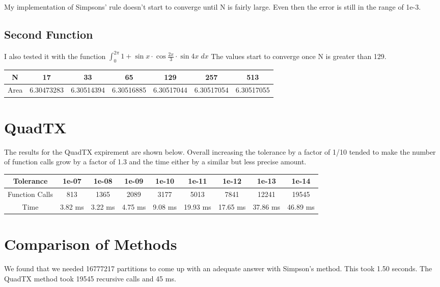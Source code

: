 \documentclass{article}
\begin{document}
My implementation of Simpsons' rule doesn't start to converge until N is fairly large. Even then the error is still in the range of 1e-3. 

\subsection{Second Function}

I also tested it with the function $\int_0^{2\pi} 1 + \sin{x} \cdot \cos{\frac{2x}{3}} \cdot \sin{4x} \;dx$ The values start to converge once N is greater than 129.
\begin{center}
	\begin{tabular}{c|c|c|c|c|c|c}
N &		17 &	33 &	65 &	129 &	257 & 513\\ \hline
	Area &	6.30473283 &	6.30514394	& 6.30516885	& 6.30517044	& 6.30517054 &	6.30517055
	\end{tabular}	
\end{center}


\section{QuadTX}

The results for the QuadTX expirement are shown below. Overall increasing the tolerance by a factor of 1/10 tended to make the number of function calls grow by a factor of  1.3 and the time either by a similar but less precise amount.

\begin{center}
\begin{tabular}{c|c|c|c|c|c|c|c|c}
 Tolerance & 1e-07& 1e-08& 1e-09& 1e-10& 1e-11& 1e-12& 1e-13& 1e-14\\ \hline
Function Calls & 813& 1365& 2089& 3177& 5013& 7841& 12241& 19545\\ \hline
Time &  3.82 ms & 3.22 ms & 4.75 ms & 9.08 ms & 19.93 ms & 17.65 ms & 37.86 ms & 46.89 ms  \\
\end{tabular}
\end{center}


\section{Comparison of Methods}

We found that we needed 16777217 partitions to come up with an adequate answer with Simpson's method. This took 1.50 seconds. The QuadTX method took 19545 recursive calls and 45 ms.
\end{document}
